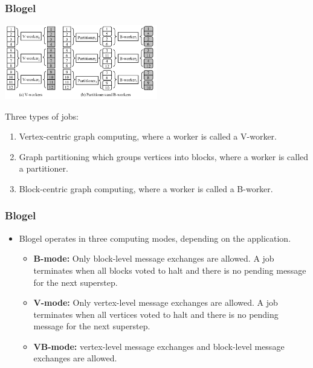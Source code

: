 \begin{frame}
 \frametitle{Blogel}
\begin{center}
 \includegraphics[keepaspectratio=true,width=0.5\textwidth]{figs/12/blogel}
\end{center}
\begin{block}{}
Three types of jobs:
\begin{enumerate}
 \item Vertex-centric graph computing, where a worker is called a V-worker. 
 \item Graph partitioning which groups vertices into blocks, where a worker is called a partitioner. 
 \item Block-centric graph computing, where a worker is called a B-worker. 
\end{enumerate}
\end{block}
\end{frame}


\begin{frame}
 \frametitle{Blogel}

\begin{itemize}
 \item Blogel operates in three computing modes, depending on the application.
 \begin{itemize}
   \item \textbf{B-mode:} Only block-level message exchanges are allowed. A job terminates when all blocks voted to halt and there is no pending message for the next superstep. 
   \item \textbf{V-mode:} Only vertex-level message exchanges are allowed. A job terminates when all vertices voted to halt and there is no pending message for the next superstep. 
   \item \textbf{VB-mode:} vertex-level message exchanges and block-level message exchanges are allowed. 
 \end{itemize}
\end{itemize}
\end{frame}

